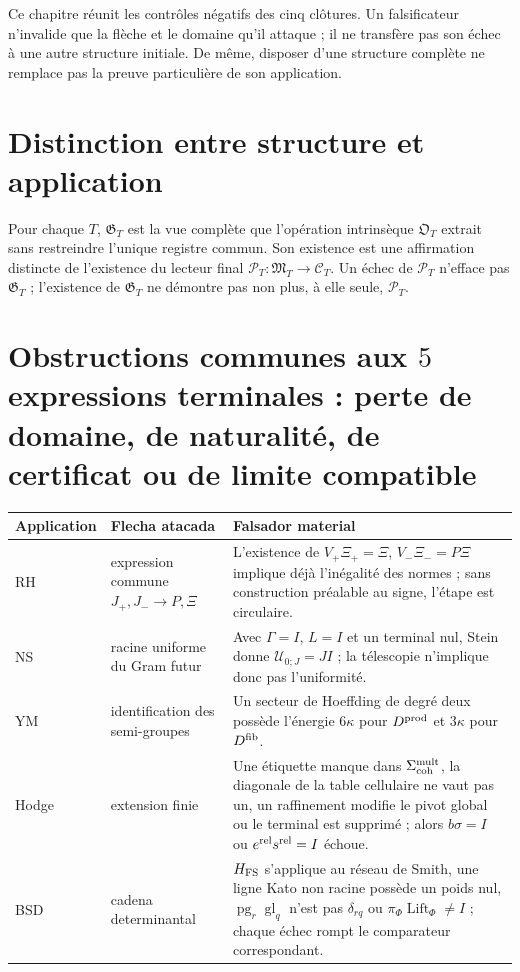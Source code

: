 
Ce chapitre réunit les contrôles négatifs des cinq clôtures. Un falsificateur n'invalide que la flèche et le domaine qu'il attaque ; il ne transfère pas son échec à une autre structure initiale. De même, disposer d'une structure complète ne remplace pas la preuve particulière de son application.

\section{Distinction entre structure et application}

Pour chaque $T$, $\mathfrak G_T$ est la vue complète que l'opération intrinsèque $\mathfrak O_T$ extrait sans restreindre l'unique registre commun. Son existence est une affirmation distincte de l'existence du lecteur final $\mathcal P_T:\mathfrak M_T\to\mathcal C_T$. Un échec de $\mathcal P_T$ n'efface pas $\mathfrak G_T$ ; l'existence de $\mathfrak G_T$ ne démontre pas non plus, à elle seule, $\mathcal P_T$.

\section{Obstructions communes aux \(5\) expressions terminales : perte de domaine, de naturalité, de certificat ou de limite compatible}

\begin{center}
\begin{tabular}{p{}p{}p{}}
\hline
Application & Flecha atacada & Falsador material \\
\hline
RH & expression commune $J_+,J_-\to P,\Xi$ & L'existence de $V_+\Xi_+=\Xi$, $V_-\Xi_-=P\Xi$ implique déjà l'inégalité des normes ; sans construction préalable au signe, l'étape est circulaire. \\
NS & racine uniforme du Gram futur & Avec $\Gamma=I$, $L=I$ et un terminal nul, Stein donne $\mathcal U_{0;J}=JI$ ; la télescopie n'implique donc pas l'uniformité. \\
YM & identification des semi-groupes & Un secteur de Hoeffding de degré deux possède l'énergie $6\kappa$ pour $D^{\rm prod}$ et $3\kappa$ pour $D^{\rm fib}$. \\
Hodge & extension finie & Une étiquette manque dans $\Sigma_{\rm coh}^{\rm mult}$, la diagonale de la table cellulaire ne vaut pas un, un raffinement modifie le pivot global ou le terminal est supprimé ; alors $b\sigma=I$ ou $e^{\rm rel}s^{\rm rel}=I$ échoue. \\
BSD & cadena determinantal & $H_{\rm FS}$ s'applique au réseau de Smith, une ligne Kato non racine possède un poids nul, $\operatorname{pg}_r\operatorname{gl}_q$ n'est pas $\delta_{rq}$ ou $\pi_\Phi\operatorname{Lift}_\Phi\ne I$ ; chaque échec rompt le comparateur correspondant. \\
\hline
\end{tabular}
\end{center}

